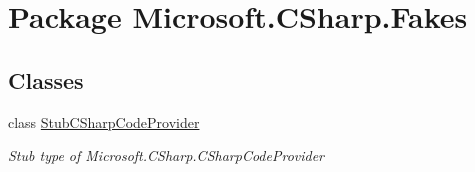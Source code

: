 \hypertarget{namespace_microsoft_1_1_c_sharp_1_1_fakes}{\section{Package Microsoft.\-C\-Sharp.\-Fakes}
\label{namespace_microsoft_1_1_c_sharp_1_1_fakes}
}
\subsection*{Classes}
\begin{DoxyCompactItemize}
\item 
class \hyperlink{class_microsoft_1_1_c_sharp_1_1_fakes_1_1_stub_c_sharp_code_provider}{Stub\-C\-Sharp\-Code\-Provider}
\begin{DoxyCompactList}\small\item\em Stub type of Microsoft.\-C\-Sharp.\-C\-Sharp\-Code\-Provider\end{DoxyCompactList}\end{DoxyCompactItemize}
